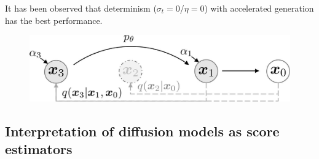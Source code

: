\begin{description}
\begin{description}
                \begin{remark}
                    It has been observed that determinism ($\sigma_t=0$/$\eta=0$) with accelerated generation has the best performance.
                \end{remark}

                \begin{figure}[H]
                    \centering
                    \includegraphics[width=0.45\linewidth]{./img/diffusion_accelerated_sampling.jpg}
                \end{figure}
        \end{description}
\end{description}


\subsection{Interpretation of diffusion models as score estimators}

